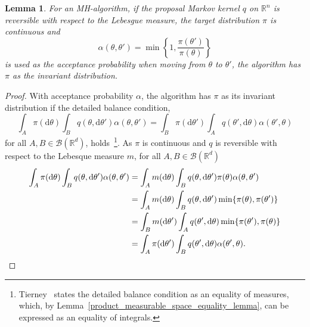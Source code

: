 \documentclass[english,twoside,openright]{HYgraduMLDS}
\newtheorem{lemma}{Lemma}[chapter]
\newcommand{\R}{\mathbb{R}}
\newcommand{\dx}{\mathrm{d}}
\begin{document}
\begin{lemma}\label{reversible_proposal_lemma}
  For an MH-algorithm,
  if the proposal Markov kernel \(q\) on \(\R^{n}\) is reversible with
  respect to the
  Lebesgue measure, the target distribution \(\pi\) is continuous and
  \[
    \alpha(\theta, \theta') = \min\left\{1, \frac{\pi(\theta')}{\pi(\theta)}\right\}
  \]
  is used as the acceptance probability when moving from \(\theta\) to \(\theta'\),
  the algorithm has \(\pi\) as the invariant distribution.
\end{lemma}
\begin{proof}
  With acceptance probability \(\alpha\), the algorithm has \(\pi\) as its
  invariant distribution if the detailed balance condition,
  \[
    \int_{A}\pi(\dx \theta)\int_{B}q(\theta, \dx \theta')\alpha(\theta, \theta')
    = \int_{B}\pi(\dx \theta')\int_{A}q(\theta', \dx \theta)\alpha(\theta', \theta)
  \]
  for all \(A, B\in \mathcal{B}(\R^{d})\), holds~\cite{Tie98}\footnote{
    Tierney~\cite{Tie98} states the detailed balance condition as an equality
    of measures, which, by Lemma~\ref{product_measurable_space_equality_lemma}, can be
    expressed as an equality of integrals.
  }.
  As \(\pi\) is continuous and \(q\) is reversible with respect to the Lebesque
  measure \(m\), for all \(A, B\in \mathcal{B}(\R^{d})\)
  \begin{align*}
    \int_{A}\pi(\dx \theta)\int_{B}q(\theta, \dx \theta')\alpha(\theta, \theta')
    &= \int_{A}m(\dx \theta)\int_{B}q(\theta, \dx \theta')\pi(\theta)\alpha(\theta, \theta')
    \\&= \int_{A}m(\dx\theta)\int_{B}q(\theta, \dx \theta')\min\{\pi(\theta), \pi(\theta')\}
    \\&= \int_{B}m(\dx\theta')\int_{A}q(\theta', \dx \theta)\min\{\pi(\theta'), \pi(\theta)\}
    \\&= \int_{A}\pi(\dx \theta')\int_{B}q(\theta', \dx \theta)\alpha(\theta', \theta).
    \qedhere
  \end{align*}
\end{proof}
\end{document}
